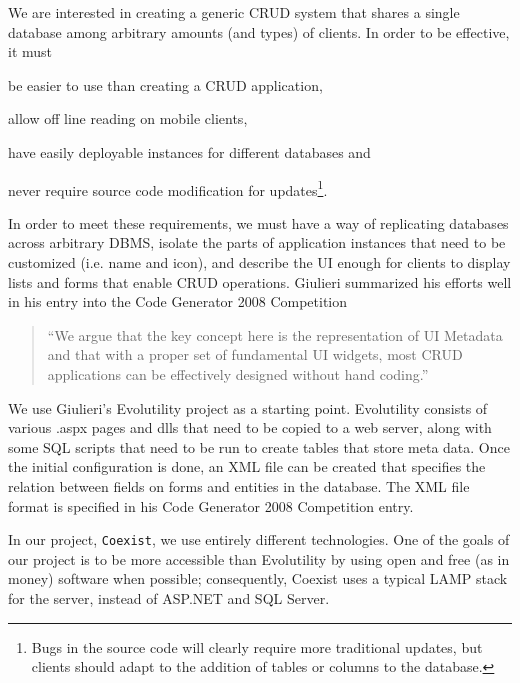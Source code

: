 \documentclass[journal]{IEEEtran}
\begin{document}





We are interested in creating a generic CRUD system that shares a single database among arbitrary amounts (and types) of clients. In order to be effective, it must 
\begin{inparaenum}
\item be easier to use than creating a CRUD application,
\item allow off line reading on mobile clients,
\item have easily deployable instances for different databases and
\item never require source code modification for updates\footnote{Bugs in the source code will clearly require more traditional updates, but clients should adapt to the addition of tables or columns to the database.}.
\end{inparaenum}
In order to meet these requirements, we must have a way of replicating databases across arbitrary DBMS, isolate the parts of application instances that need to be customized (i.e. name and icon), and describe the UI enough for clients to display lists and forms that enable CRUD operations. Giulieri summarized his efforts well in his entry into the Code Generator 2008 Competition\cite{giulieri_minimalist_2011}
\begin{quotation}
``We argue that the key concept here is the representation of UI Metadata and that with a proper set of fundamental UI widgets, most CRUD applications can be effectively designed without hand coding.''
\end{quotation}
We use Giulieri's Evolutility\cite{giulieri_evolutility_????} project as a starting point. Evolutility consists of various .aspx pages and dlls that need to be copied to a web server, along with some SQL scripts that need to be run to create tables that store meta data. Once the initial configuration is done, an XML file can be created that specifies the relation between fields on forms and entities in the database. The XML file format is specified in his Code Generator 2008 Competition entry\cite{giulieri_minimalist_2011}. 

In our project, \texttt{Coexist}, we use entirely different technologies. One of the goals of our project is to be more accessible than Evolutility by using open and free (as in money) software when possible; consequently, Coexist uses a typical LAMP stack for the server, instead of ASP.NET and SQL Server.
\end{document}
